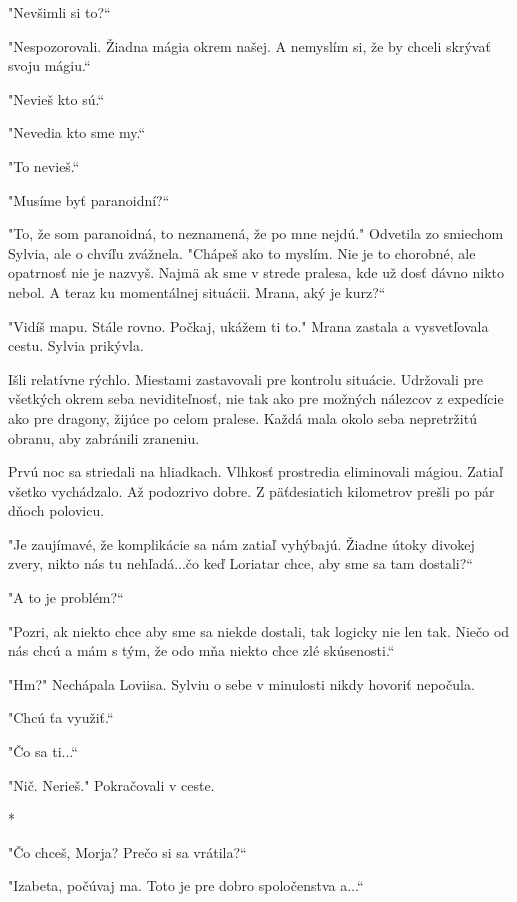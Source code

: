\documentclass{book}
\begin{document}
"$ $Nevšimli si to?“

"$ $Nespozorovali. Žiadna mágia okrem našej. A nemyslím si, že by chceli skrývať svoju mágiu.“

"$ $Nevieš kto sú.“

"$ $Nevedia kto sme my.“

"$ $To nevieš.“

"$ $Musíme byť paranoidní?“

"$ $To, že som paranoidná, to neznamená, že po mne nejdú."$ $ Odvetila zo smiechom Sylvia, ale o chvíľu zvážnela. "$ $Chápeš ako to myslím. Nie je to chorobné, ale opatrnosť nie je nazvyš. Najmä ak sme v strede pralesa, kde už dosť dávno nikto nebol. A teraz ku momentálnej situácii. Mrana, aký je kurz?“

"$ $Vidíš mapu. Stále rovno. Počkaj, ukážem ti to."$ $ Mrana zastala a vysvetľovala cestu. Sylvia prikývla.

Išli relatívne rýchlo. Miestami zastavovali pre kontrolu situácie. Udržovali pre všetkých okrem seba neviditeľnosť, nie tak ako pre možných nálezcov z expedície ako pre dragony, žijúce po celom pralese. Každá mala okolo seba nepretržitú obranu, aby zabránili zraneniu.

Prvú noc sa striedali na hliadkach. Vlhkosť prostredia eliminovali mágiou. Zatiaľ všetko vychádzalo. Až podozrivo dobre. Z päťdesiatich kilometrov prešli po pár dňoch polovicu.

"$ $Je zaujímavé, že komplikácie sa nám zatiaľ vyhýbajú. Žiadne útoky divokej zvery, nikto nás tu nehľadá...čo keď Loriatar chce, aby sme sa tam dostali?“

"$ $A to je problém?“

"$ $Pozri, ak niekto chce aby sme sa niekde dostali, tak logicky nie len tak. Niečo od nás chcú a mám s tým, že odo mňa niekto chce zlé skúsenosti.“

"$ $Hm?"$ $ Nechápala Loviisa. Sylviu o sebe v minulosti nikdy hovoriť nepočula.

"$ $Chcú ťa využiť.“

"$ $Čo sa ti...“

"$ $Nič. Nerieš."$ $ Pokračovali v ceste.

\begin{center}

*

\end{center}

"$ $Čo chceš, Morja? Prečo si sa vrátila?“

"$ $Izabeta, počúvaj ma. Toto je pre dobro spoločenstva a...“
\end{document}
